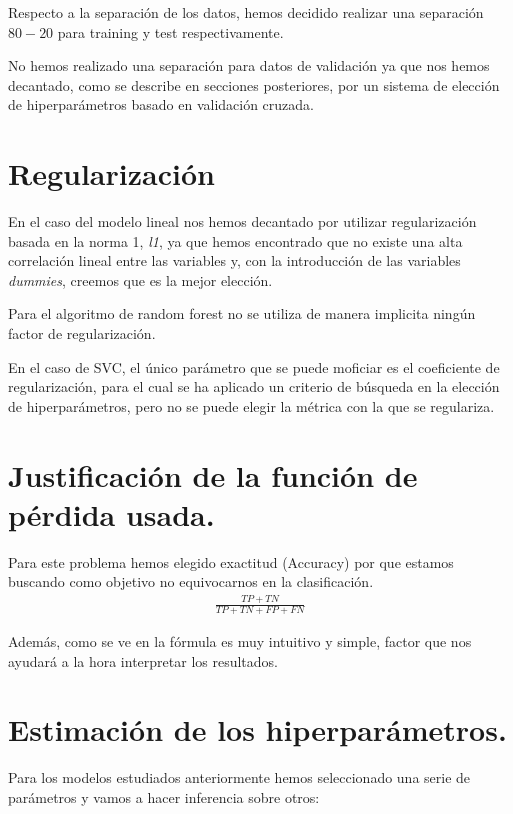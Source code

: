 \documentclass[a4paper,11pt]{article}
\begin{document}
Respecto a la separación de los datos, hemos decidido realizar una separación
$80-20$ para training y test respectivamente.

No hemos realizado una separación para datos de validación ya que nos hemos
decantado, como se describe en secciones posteriores, por un sistema de elección
de hiperparámetros basado en validación cruzada.

\section{Regularización}

En el caso del modelo lineal nos hemos decantado por utilizar regularización
basada en la norma 1, \textit{l1}, ya que hemos encontrado que no existe una
alta correlación lineal entre las variables y, con la introducción de las
variables \textit{dummies}, creemos que es la mejor elección. 

Para el algoritmo de random forest no se utiliza de manera implicita ningún
factor de regularización.

En el caso de SVC, el único parámetro que se puede moficiar es el coeficiente de
regularización, para el cual se ha aplicado un criterio de búsqueda en la
elección de hiperparámetros, pero no se puede elegir la métrica con la que se
regulariza.


\section{Justificación de la función de pérdida usada.}

Para este problema hemos elegido exactitud (Accuracy) por que estamos buscando como objetivo no equivocarnos en la clasificación. 
\begin{align*}
\frac{TP+TN}{TP+TN+FP+FN}
\end{align*}

Además, como se ve en la fórmula es muy intuitivo y simple, factor que nos ayudará a la hora interpretar los resultados.

\section{}

\section{Estimación de los hiperparámetros.}

Para los modelos estudiados anteriormente hemos seleccionado una serie de parámetros y vamos a hacer inferencia sobre otros:
\end{document}
